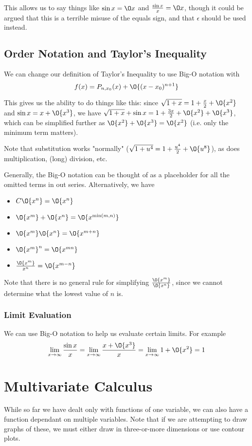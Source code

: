 \documentclass[12pt]{article}
\begin{document}
This allows us to say things like $\sin x = \O x$ and $\frac{\sin x}{x} = \O x$, though it could be argued that this is a terrible misuse of the equals sign, and that $\epsilon$ should be used instead.

\subsection*{Order Notation and Taylor's Inequality}
We can change our definition of Taylor's Inequality to use Big-O notation with \[ f(x) = P_{n,x_0} (x) + \O{(x-x_0)^{n+1}} \]

This gives us the ability to do things like this: since $\sqrt{1 + x} = 1 + \frac{x}{2} + \O{x^2}$ and $\sin x = x + \O{x^3}$, we have $\sqrt{1+x} + \sin x = 1 + \frac{3x}{2} + \O{x^2} + \O{x^3}$, which can be simplified further as $\O{x^2} + \O{x^3} = \O{x^2}$ (i.e. only the minimum term matters).

Note that substitution works "normally" ($\sqrt{1 + u^4} = 1 + \frac{u^4}{2} + \O{u^8}$), as does multiplication, (long) division, etc.

Generally, the Big-O notation can be thought of as a placeholder for all the omitted terms in out series. Alternatively, we have
\begin{itemize}
\item $C \O{x^n} = \O{x^n}$
\item $\O{x^m} + \O{x^n} = \O{x^{\min(m,n)}}$
\item $\O{x^m} \O{x^n} = \O{x^{m+n}}$
\item $\O{x^m}^n = \O{x^{mn}}$
\item $\frac{\O{x^m}}{x^n} = \O{x^{m-n}}$
\end{itemize}
Note that there is no general rule for simplifying $\frac{\O{x^m}}{\O{x^n}}$, since we cannot determine what the lowest value of $n$ is.

\subsubsection*{Limit Evaluation}
We can use Big-O notation to help us evaluate certain limits. For example \[ \lim_{x\to\infty} \frac{\sin x}{x} = \lim_{x\to\infty} \frac{x+\O{x^3}}{x} = \lim_{x\to\infty} 1 + \O{x^2} = 1 \]

\section*{Multivariate Calculus}
While so far we have dealt only with functions of one variable, we can also have a function dependant on multiple variables. Note that if we are attempting to draw graphs of these, we must either draw in three-or-more dimensions or use contour plots.
\end{document}
